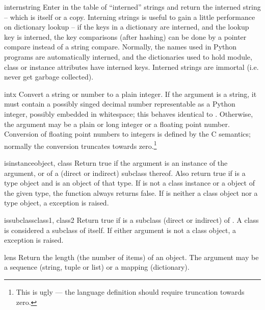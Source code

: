 \begin{funcdesc}{intern}{string}
  Enter  in the table of ``interned'' strings and return
  the interned string -- which is  itself or a copy.
  Interning strings is useful to gain a little performance on
  dictionary lookup -- if the keys in a dictionary are interned, and
  the lookup key is interned, the key comparisons (after hashing) can
  be done by a pointer compare instead of a string compare.  Normally,
  the names used in Python programs are automatically interned, and
  the dictionaries used to hold module, class or instance attributes
  have interned keys.  Interned strings are immortal (i.e. never get
  garbage collected).
\end{funcdesc}

\begin{funcdesc}{int}{x}
  Convert a string or number to a plain integer.  If the argument is a
  string, it must contain a possibly singed decimal number
  representable as a Python integer, possibly embedded in whitespace;
  this behaves identical to .
  Otherwise, the argument may be a plain or
  long integer or a floating point number.  Conversion of floating
  point numbers to integers is defined by the C semantics; normally
  the conversion truncates towards zero.\footnote{This is ugly --- the
  language definition should require truncation towards zero.}
\end{funcdesc}

\begin{funcdesc}{isinstance}{object, class}
Return true if the  argument is an instance of the
 argument, or of a (direct or indirect) subclass thereof.
Also return true if  is a type object and  is
an object of that type.  If  is not a class instance or a
object of the given type, the function always returns false.  If
 is neither a class object nor a type object, a
 exception is raised.
\end{funcdesc}

\begin{funcdesc}{issubclass}{class1, class2}
Return true if  is a subclass (direct or indirect) of
.  A class is considered a subclass of itself.  If either
argument is not a class object, a  exception is raised.
\end{funcdesc}

\begin{funcdesc}{len}{s}
  Return the length (the number of items) of an object.  The argument
  may be a sequence (string, tuple or list) or a mapping (dictionary).
\end{funcdesc}

